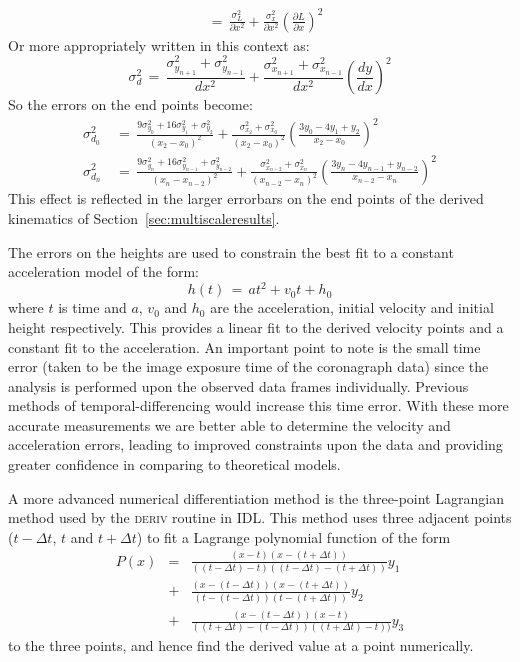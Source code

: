 \documentclass[namedreferences]{SolarPhysics}
\begin{document}
\begin{article}
\begin{eqnarray}
&=\, \frac{\sigma_L^2}{\partial x^2}+\frac{\sigma_x^2}{\partial x^2}\left(\frac{\partial L}{\partial x}\right)^2
\end{eqnarray}
Or more appropriately written in this context as:
\begin{equation}
\sigma_d^2 \,=\, \frac{\sigma_{y_{n+1}}^2+\sigma_{y_{n-1}}^2}{dx^2} + \frac{\sigma_{x_{n+1}}^2+\sigma_{x_{n-1}}^2}{dx^2}\left(\frac{dy}{dx}\right)^2
\end{equation}
So the errors on the end points become:
\begin{eqnarray}
\sigma_{d_0}^2 \,&=\, \frac{9\sigma_{y_0}^2+16\sigma_{y_1}^2+\sigma_{y_2}^2}{\left(x_2-x_0\right)^2} + \frac{\sigma_{x_2}^2+\sigma_{x_0}^2}{\left(x_2-x_0\right)^2} \left( \frac{3y_0-4y_1+y_2}{x_2-x_0}\right)^2 \\
\sigma_{d_n}^2 \,&=\, \frac{9\sigma_{y_n}^2+16\sigma_{y_{n-1}}^2+\sigma_{y_{n-2}}^2}{\left(x_n-x_{n-2}\right)^2} + \frac{\sigma_{x_{n-2}}^2+\sigma_{x_n}^2}{\left(x_{n-2}-x_n\right)^2} \left( \frac{3y_n-4y_{n-1}+y_{n-2}}{x_{n-2}-x_n}\right)^2
\end{eqnarray}
This effect is reflected in the larger errorbars on the end points of the derived kinematics of Section~\ref{sec:multiscaleresults}.

\par
The errors on the heights are used to constrain the best fit to a constant acceleration model of the form:
\begin{equation}
h(t)\,=\,at^2+v_0t+h_0
\end{equation}
where $t$ is time and $a$, $v_0$ and $h_0$ are the acceleration, initial velocity and initial height respectively. This provides a linear fit to the derived velocity points and a constant fit to the acceleration. An important point to note is the small time error (taken to be the image exposure time of the coronagraph data) since the analysis is performed upon the observed data frames individually. Previous methods of temporal-differencing would increase this time error. With these more accurate measurements we are better able to determine the velocity and acceleration errors, leading to improved constraints upon the data and providing greater confidence in comparing to theoretical models.


A more advanced numerical differentiation method is the three-point Lagrangian method used by the \textsc{deriv} routine in IDL. This method uses three adjacent points ($t-\Delta t$, $t$ and $t+\Delta t$) to fit a Lagrange polynomial function of the form
\begin{eqnarray}
P(x) &=& \frac{(x - t)(x - (t+\Delta t))}{((t-\Delta t) - t)((t-\Delta t)- (t+\Delta t))}y_{1} \nonumber \\
&+& \frac{(x - (t-\Delta t))(x - (t+\Delta t))}{(t - (t-\Delta t))(t - (t+\Delta t))}y_{2} \nonumber \\ 
&+& \frac{(x - (t-\Delta t))(x - t)}{((t+\Delta t) - (t-\Delta t))((t+\Delta t) - t))}y_{3}
\end{eqnarray}
to the three points, and hence find the derived value at a point numerically.


\end{article}
\end{document}
